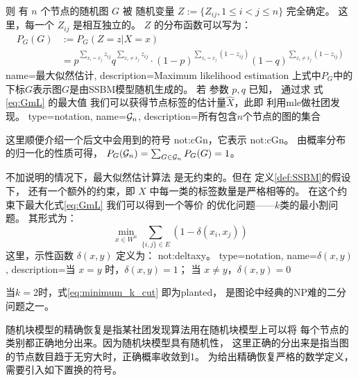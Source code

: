 则 有 $n$ 个节点的随机图 $G$ 
被 
随机变量 $Z:=\{Z_{ij}, 1\leq i<j\leq n\}$ 完全确定。
这里，每一个 $Z_{ij}$ 是相互独立的。
$Z$ 的分布函数可以写为：
\begin{align}\label{eq:mle_sibm}
P_G(G)&:=P_G(Z = z| X=x) \\
&= p^{\sum_{x_i = x_j}
z_{ij}}q^{\sum_{x_i \neq x_j} z_{ij}} 
\cdot (1-p)^{\sum_{x_i = x_j} (1-z_{ij})}
(1-q)^{\sum_{x_i \neq x_j} (1-z_{ij})}
\label{eq:GmL}
\end{align}
{name=最大似然估计,
description={Maximum likelihood estimation}}
上式中$P_G$中的下标$G$表示图$G$是由SSBM模型随机生成的。
若 参数 $p, q$ 已知，
通过求
式\eqref{eq:GmL} 的最大值
我们可以获得节点标签的估计量$\hat{X}$，此即
利用\gls{mle}做社团发现。
{
  type=notation,
  name={$\mathcal{G}_n$},
  description={所有包含$n$个节点的图的集合}
}

这里顺便介绍一个后文中会用到的符号 \gls{not:cGn}，它表示
\glsdesc{not:cGn}。
由概率分布的归一化的性质可得，
$P_G(\mathcal{G}_n) = \sum_{G\in \mathcal{G}_n}P_G(G)=1$。

不加说明的情况下，最大似然估计算法 是无约束的。但在
定义\ref{def:SSBM}的假设下，
还有一个额外的约束，即 $X$ 中每一类的标签数量是严格相等的。
在这个约束下最大化式\eqref{eq:GmL} 我们可以得到一个等价
的优化问题——$k$类的最小割问题。
其形式为：
\begin{equation}\label{eq:minimum_k_cut}
  \min_{x\in W^n} \sum_{ \{i,j\} \in E} (1-\delta(x_i, x_j))
\end{equation}
这里，示性函数 $\delta(x,y)$ 定义为：
\glsdesc{not:deltaxy}。
{
  type=notation,
  name={$\delta(x,y)$},
  description={当 $x=y$ 时，$\delta(x,y) = 1$； 当 $x\neq y$，$\delta(x,y)=0$}
}

当$k=2$时，式\eqref{eq:minimum_k_cut} 即为\gls{planted}，
是图论中经典的NP难的二分问题之一。


随机块模型的精确恢复是指某社团发现算法用在随机块模型上可以将
每个节点的类别都正确地分出来。因为随机块模型具有随机性，
这里正确的分出来是指当图的节点数目趋于无穷大时，正确概率收敛到1。
为给出精确恢复严格的数学定义，需要引入如下置换的符号。

